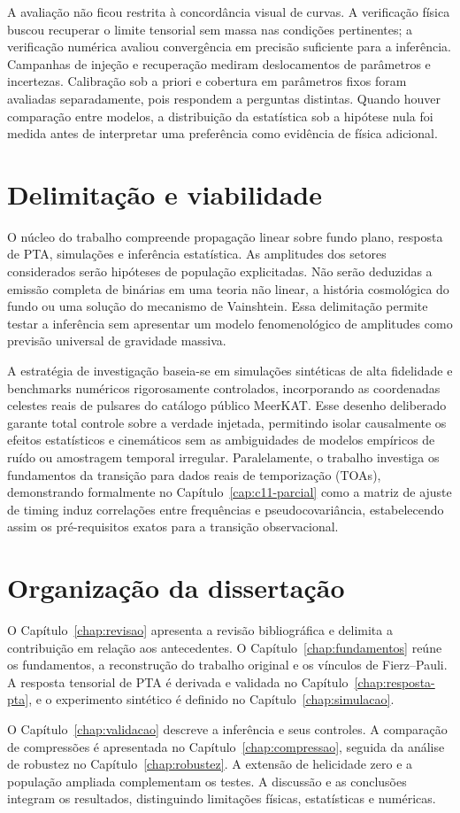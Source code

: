 A avaliação não ficou restrita à concordância visual de curvas. A
verificação física buscou recuperar o limite tensorial sem massa nas
condições pertinentes; a verificação numérica avaliou
convergência em precisão suficiente para a inferência. Campanhas de
injeção e recuperação mediram deslocamentos de parâmetros e
incertezas. Calibração sob a priori e cobertura em parâmetros fixos
foram avaliadas separadamente, pois respondem a perguntas distintas.
Quando houver comparação entre modelos, a distribuição da estatística
sob a hipótese nula foi medida antes de interpretar uma preferência
como evidência de física adicional.

\section{Delimitação e viabilidade}

O núcleo do trabalho compreende
propagação linear sobre fundo plano, resposta de PTA, simulações e
inferência estatística. As amplitudes dos setores considerados serão
hipóteses de população explicitadas. Não serão deduzidas a emissão
completa de binárias em uma teoria não linear, a história cosmológica
do fundo ou uma solução do mecanismo de Vainshtein. Essa delimitação
permite testar a inferência sem apresentar um modelo fenomenológico de
amplitudes como previsão universal de gravidade massiva.

A estratégia de investigação baseia-se em simulações sintéticas de alta fidelidade e benchmarks numéricos rigorosamente controlados, incorporando as coordenadas celestes reais de pulsares do catálogo público MeerKAT. Esse desenho deliberado garante total controle sobre a verdade injetada, permitindo isolar causalmente os efeitos estatísticos e cinemáticos sem as ambiguidades de modelos empíricos de ruído ou amostragem temporal irregular. Paralelamente, o trabalho investiga os fundamentos da transição para dados reais de temporização (TOAs), demonstrando formalmente no Capítulo~\ref{cap:c11-parcial} como a matriz de ajuste de timing induz correlações entre frequências e pseudocovariância, estabelecendo assim os pré-requisitos exatos para a transição observacional.

\section{Organização da dissertação}

O Capítulo~\ref{chap:revisao} apresenta a revisão bibliográfica e delimita a contribuição em relação aos antecedentes. O Capítulo~\ref{chap:fundamentos} reúne os fundamentos, a reconstrução do trabalho original e os vínculos de Fierz--Pauli. A resposta tensorial de PTA é derivada e validada no Capítulo~\ref{chap:resposta-pta}, e o experimento sintético é definido no Capítulo~\ref{chap:simulacao}.

O Capítulo~\ref{chap:validacao} descreve a inferência e seus controles. A comparação de compressões é apresentada no Capítulo~\ref{chap:compressao}, seguida da análise de robustez no Capítulo~\ref{chap:robustez}. A extensão de helicidade zero e a população ampliada complementam os testes. A discussão e as conclusões integram os resultados, distinguindo limitações físicas, estatísticas e numéricas.
